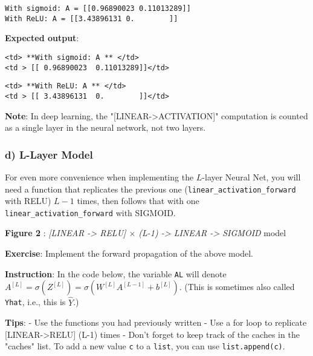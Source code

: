 \documentclass[11pt]{article}
\begin{document}
    \begin{Verbatim}[commandchars=\\\{\}]
With sigmoid: A = [[0.96890023 0.11013289]]
With ReLU: A = [[3.43896131 0.        ]]

    \end{Verbatim}

    \textbf{Expected output}:

\begin{verbatim}
<td> **With sigmoid: A ** </td>
<td > [[ 0.96890023  0.11013289]]</td> 
\end{verbatim}

\begin{verbatim}
<td> **With ReLU: A ** </td>
<td > [[ 3.43896131  0.        ]]</td> 
\end{verbatim}

    \textbf{Note}: In deep learning, the
"{[}LINEAR-\textgreater{}ACTIVATION{]}" computation is counted as a
single layer in the neural network, not two layers.

    \subsubsection{d) L-Layer Model}\label{d-l-layer-model}

For even more convenience when implementing the \(L\)-layer Neural Net,
you will need a function that replicates the previous one
(\texttt{linear\_activation\_forward} with RELU) \(L-1\) times, then
follows that with one \texttt{linear\_activation\_forward} with SIGMOID.

\textbf{Figure 2} : \emph{{[}LINEAR -\textgreater{} RELU{]} \(\times\)
(L-1) -\textgreater{} LINEAR -\textgreater{} SIGMOID} model

\textbf{Exercise}: Implement the forward propagation of the above model.

\textbf{Instruction}: In the code below, the variable \texttt{AL} will
denote
\(A^{[L]} = \sigma(Z^{[L]}) = \sigma(W^{[L]} A^{[L-1]} + b^{[L]})\).
(This is sometimes also called \texttt{Yhat}, i.e., this is
\(\hat{Y}\).)

\textbf{Tips}: - Use the functions you had previously written - Use a
for loop to replicate {[}LINEAR-\textgreater{}RELU{]} (L-1) times -
Don't forget to keep track of the caches in the "caches" list. To add a
new value \texttt{c} to a \texttt{list}, you can use
\texttt{list.append(c)}.
\end{document}
